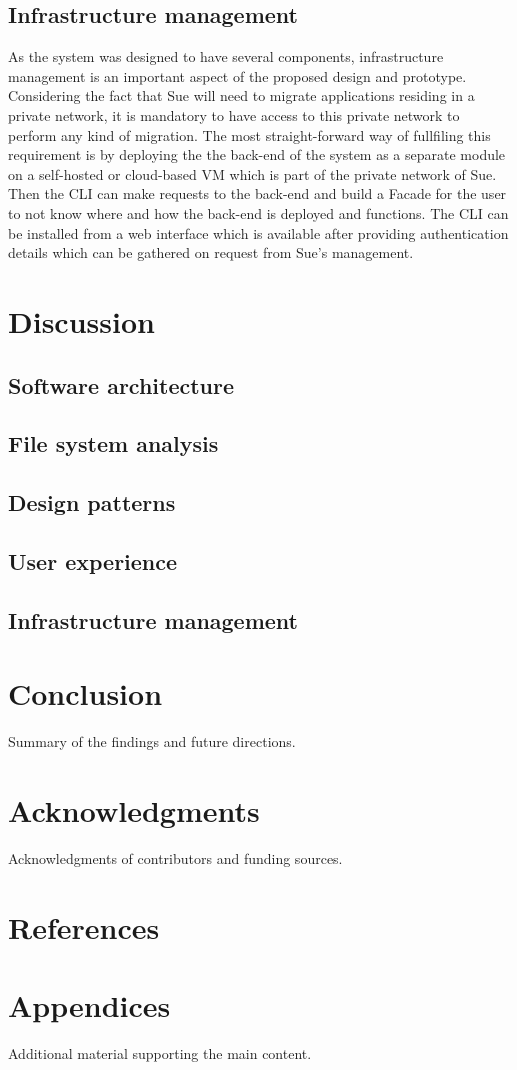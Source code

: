 \documentclass{article}
\begin{document}
\begin{multicols}{2}
\subsection{Infrastructure management}
As the system was designed to have several components, infrastructure management is an important aspect of the proposed design and prototype. Considering the fact that Sue will need to migrate applications residing in a private network, it is mandatory to have access to this private network to perform any kind of migration. The most straight-forward way of fullfiling this requirement is by deploying the the back-end of the system as a separate module on a self-hosted or cloud-based VM which is part of the private network of Sue. Then the CLI can make requests to the back-end and build a Facade for the user to not know where and how the back-end is deployed and functions. The CLI can be installed from a web interface which is available after providing authentication details which can be gathered on request from Sue's management.

\section{Discussion}
\subsection{Software architecture}
\subsection{File system analysis}
\subsection{Design patterns}
\subsection{User experience}
\subsection{Infrastructure management}

\section{Conclusion}
Summary of the findings and future directions.

\section{Acknowledgments}
Acknowledgments of contributors and funding sources.

\section{References}
\nocite{*}



\section{Appendices}
Additional material supporting the main content.

\end{multicols}
\end{document}
